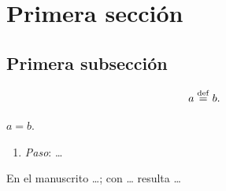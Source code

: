 \documentclass[11pt,a4paper,twoside]{article}
\begin{document}
\setcounter{page}{2}
{\hypersetup{linkcolor=fg}\tableofcontents}

\section{Primera sección}
\subsection{Primera subsección}

\begin{definicion}[Nombre]
\begin{equation}
a\stackrel{\mathrm{def}}{=} b .
\end{equation}
\end{definicion}

\begin{proposicion}[Nombre]
$a=b$.
\end{proposicion}

\begin{demostracion}
\begin{enumerate}
\item \emph{Paso}: \dots
\end{enumerate}
\end{demostracion}

\begin{observacion}[Notación]
En el manuscrito \dots; con \dots{} resulta \dots
\end{observacion}
\end{document}
